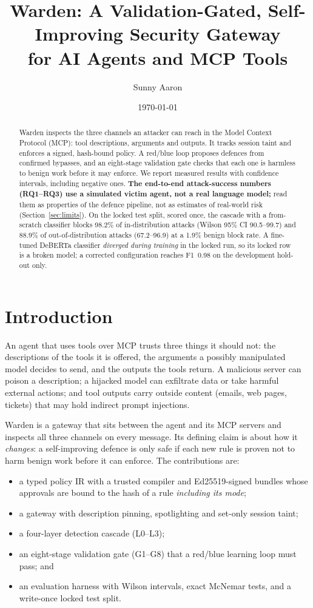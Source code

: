 \documentclass[11pt,a4paper]{article}
\title{Warden: A Validation-Gated, Self-Improving Security Gateway\\for AI Agents and MCP Tools}
\author{Sunny Aaron}
\date{\today}
\begin{document}
\maketitle

\begin{abstract}
Warden inspects the three channels an attacker can reach in the Model Context Protocol (MCP):
tool descriptions, arguments and outputs. It tracks session taint and enforces a signed,
hash-bound policy. A red/blue loop proposes defences from confirmed bypasses, and an eight-stage
validation gate checks that each one is harmless to benign work before it may enforce. We report
measured results with confidence intervals, including negative ones. \textbf{The end-to-end
attack-success numbers (RQ1--RQ3) use a simulated victim agent, not a real language model;} read
them as properties of the defence pipeline, not as estimates of real-world risk
(Section~\ref{sec:limits}). On the locked test split, scored once, the cascade with a from-scratch
classifier blocks 98.2\% of in-distribution attacks (Wilson 95\% CI 90.5--99.7) and 88.9\% of
out-of-distribution attacks (67.2--96.9) at a 1.9\% benign block rate. A fine-tuned DeBERTa
classifier \emph{diverged during training} in the locked run, so its locked row is a broken model;
a corrected configuration reaches F1~0.98 on the development hold-out only.
\end{abstract}

\section{Introduction}
An agent that uses tools over MCP trusts three things it should not: the descriptions of the tools
it is offered, the arguments a possibly manipulated model decides to send, and the outputs the tools
return. A malicious server can poison a description; a hijacked model can exfiltrate data or take
harmful external actions; and tool outputs carry outside content (emails, web pages, tickets) that
may hold indirect prompt injections.

Warden is a gateway that sits between the agent and its MCP servers and inspects all three
channels on every message. Its defining claim is about how it \emph{changes}: a self-improving
defence is only safe if each new rule is proven not to harm benign work before it can enforce. The
contributions are:
\begin{itemize}
  \item a typed policy IR with a trusted compiler and Ed25519-signed bundles whose approvals are bound to the hash of a rule \emph{including its mode};
  \item a gateway with description pinning, spotlighting and set-only session taint;
  \item a four-layer detection cascade (L0--L3);
  \item an eight-stage validation gate (G1--G8) that a red/blue learning loop must pass; and
  \item an evaluation harness with Wilson intervals, exact McNemar tests, and a write-once locked test split.
\end{itemize}
\end{document}
